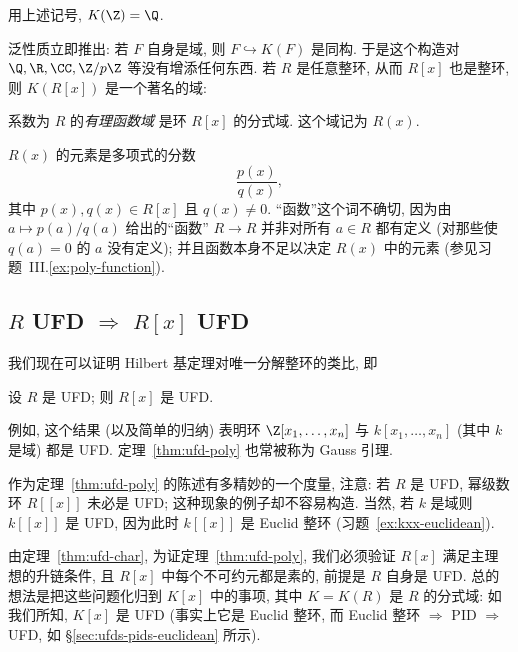 \begin{example}\label{ex:Q-field-of-fractions}
用上述记号, $K(\Z)=\Q$.
\end{example}

\noindent 泛性质立即推出: 若 $F$ 自身是域, 则 $F\hookrightarrow K(F)$ 是同构. 于是这个构造对 $\Q,\R,\CC,\Z/p\Z$ 等没有增添任何东西. 若 $R$ 是任意整环, 从而 $R[x]$ 也是整环, 则 $K(R[x])$ 是一个著名的域:

\begin{definition}\label{def:rational-function-field}
系数为 $R$ 的\emph{有理函数域} 是环 $R[x]$ 的分式域. 这个域记为 $R(x)$.
\end{definition}

\noindent $R(x)$ 的元素是多项式的分数
\[
\frac{p(x)}{q(x)},
\]
其中 $p(x),q(x)\in R[x]$ 且 $q(x)\neq 0$. ``函数''这个词不确切, 因为由 $a\mapsto p(a)/q(a)$ 给出的``函数'' $R\to R$ 并非对所有 $a\in R$ 都有定义 (对那些使 $q(a)=0$ 的 $a$ 没有定义); 并且函数本身不足以决定 $R(x)$ 中的元素 (参见习题~III.\ref{ex:poly-function}).

\subsection{\texorpdfstring{$R$}{R} UFD \texorpdfstring{$\Rightarrow$}{=>} \texorpdfstring{$R[x]$}{R[x]} UFD}
\label{subsec:ufd-poly}

我们现在可以证明 Hilbert 基定理对唯一分解整环的类比, 即

\begin{theorem}\label{thm:ufd-poly}
设 $R$ 是 UFD; 则 $R[x]$ 是 UFD.
\end{theorem}

\noindent 例如, 这个结果 (以及简单的归纳) 表明环 $\Z[x_1,\dots,x_n]$ 与 $k[x_1,\dots,x_n]$ (其中 $k$ 是域) 都是 UFD. 定理~\ref{thm:ufd-poly} 也常被称为 Gauss 引理.

\noindent 作为定理~\ref{thm:ufd-poly} 的陈述有多精妙的一个度量, 注意: 若 $R$ 是 UFD, 幂级数环 $R[[x]]$ 未必是 UFD; 这种现象的例子却不容易构造. 当然, 若 $k$ 是域则 $k[[x]]$ 是 UFD, 因为此时 $k[[x]]$ 是 Euclid 整环 (习题~\ref{ex:kxx-euclidean}).

\noindent 由定理~\ref{thm:ufd-char}, 为证定理~\ref{thm:ufd-poly}, 我们必须验证 $R[x]$ 满足主理想的升链条件, 且 $R[x]$ 中每个不可约元都是素的, 前提是 $R$ 自身是 UFD. 总的想法是把这些问题化归到 $K[x]$ 中的事项, 其中 $K=K(R)$ 是 $R$ 的分式域: 如我们所知, $K[x]$ 是 UFD (事实上它是 Euclid 整环, 而 Euclid 整环 $\Rightarrow$ PID $\Rightarrow$ UFD, 如 §\ref{sec:ufds-pids-euclidean} 所示).


